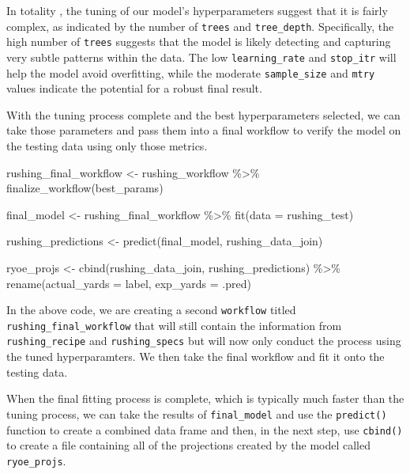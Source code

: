\documentclass[
  letterpaper,
]{krantz}
\newenvironment{Shaded}{\begin{snugshade}}{\end{snugshade}}
\newcommand{\AttributeTok}[1]{\textcolor[rgb]{0.40,0.45,0.13}{#1}}
\newcommand{\FunctionTok}[1]{\textcolor[rgb]{0.28,0.35,0.67}{#1}}
\newcommand{\NormalTok}[1]{\textcolor[rgb]{0.00,0.23,0.31}{#1}}
\newcommand{\OtherTok}[1]{\textcolor[rgb]{0.00,0.23,0.31}{#1}}
\newcommand{\SpecialCharTok}[1]{\textcolor[rgb]{0.37,0.37,0.37}{#1}}
\begin{document}
In totality , the tuning of our model's hyperparameters suggest that it
is fairly complex, as indicated by the number of \texttt{trees} and
\texttt{tree\_depth}. Specifically, the high number of \texttt{trees}
suggests that the model is likely detecting and capturing very subtle
patterns within the data. The low \texttt{learning\_rate} and
\texttt{stop\_itr} will help the model avoid overfitting, while the
moderate \texttt{sample\_size} and \texttt{mtry} values indicate the
potential for a robust final result.

With the tuning process complete and the best hyperparameters selected,
we can take those parameters and pass them into a final workflow to
verify the model on the testing data using only those metrics.

\begin{Shaded}
\begin{Highlighting}[]
\NormalTok{rushing\_final\_workflow }\OtherTok{\textless{}{-}}\NormalTok{ rushing\_workflow }\SpecialCharTok{\%\textgreater{}\%}
  \FunctionTok{finalize\_workflow}\NormalTok{(best\_params)}

\NormalTok{final\_model }\OtherTok{\textless{}{-}}\NormalTok{ rushing\_final\_workflow }\SpecialCharTok{\%\textgreater{}\%}
  \FunctionTok{fit}\NormalTok{(}\AttributeTok{data =}\NormalTok{ rushing\_test)}

\NormalTok{rushing\_predictions }\OtherTok{\textless{}{-}} \FunctionTok{predict}\NormalTok{(final\_model, rushing\_data\_join)}

\NormalTok{ryoe\_projs }\OtherTok{\textless{}{-}} \FunctionTok{cbind}\NormalTok{(rushing\_data\_join, rushing\_predictions) }\SpecialCharTok{\%\textgreater{}\%}
  \FunctionTok{rename}\NormalTok{(}\AttributeTok{actual\_yards =}\NormalTok{ label,}
         \AttributeTok{exp\_yards =}\NormalTok{ .pred)}
\end{Highlighting}
\end{Shaded}

In the above code, we are creating a second \texttt{workflow} titled
\texttt{rushing\_final\_workflow} that will still contain the
information from \texttt{rushing\_recipe} and \texttt{rushing\_specs}
but will now only conduct the process using the tuned hyperparamters. We
then take the final workflow and fit it onto the testing data.

When the final fitting process is complete, which is typically much
faster than the tuning process, we can take the results of
\texttt{final\_model} and use the \texttt{predict()} function to create
a combined data frame and then, in the next step, use \texttt{cbind()}
to create a file containing all of the projections created by the model
called \texttt{ryoe\_projs}.
\end{document}
